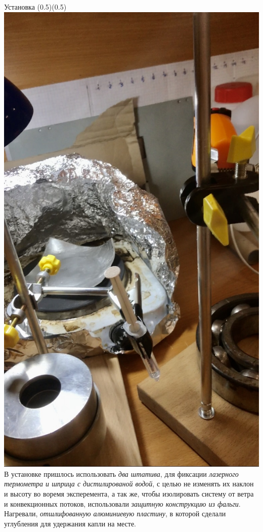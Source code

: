 \begin{frame}{Установка}
\sidefig (0.5\linewidth)(0.5\linewidth) {\includegraphics[scale=0.155]{97B356EC-468F-416D-9B06-919921896A27_1_201_a.jpeg}}{В установке пришлось использовать \textcolor[RGB]{0,128,255}{\sl два штатива}, для фиксации \textcolor[RGB]{0,128,255}{\sl лазерного термометра и шприца с дистилированой водой}, с целью не изменять их наклон и высоту во воремя эксперемента, а так же, чтобы изолировать систему от ветра и конвекционных потоков, использовали \textcolor[RGB]{0,128,255}{\sl защитную конструкцию из фальги}. Нагревали, \textcolor[RGB]{0,128,255}{\sl отшлифованную алюминиевую пластину}, в которой сделали углубления для удержания капли на месте.}

\end{frame}

